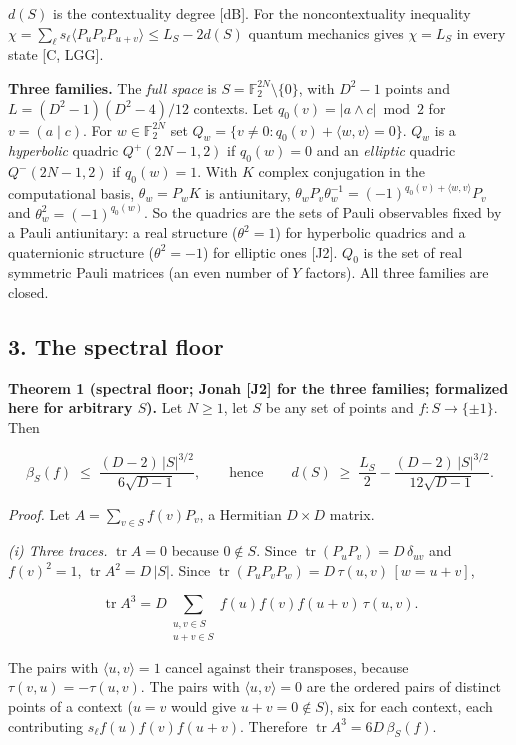 \documentclass[11pt,a4paper]{article}
\begin{document}
\(d(S)\) is the contextuality degree {[}dB{]}. For the noncontextuality inequality
\(\chi = \sum_\ell s_\ell \langle P_u P_v P_{u+v}\rangle \le L_S - 2 d(S)\) quantum mechanics gives
\(\chi = L_S\) in every state {[}C, LGG{]}.

\textbf{Three families.} The \emph{full space} is \(S = \mathbb{F}_2^{2N}\setminus\{0\}\), with \(D^2-1\) points
and \(L = (D^2-1)(D^2-4)/12\) contexts. Let \(q_0(v)=|a\wedge c|\bmod2\) for \(v=(a\mid c)\).
For \(w\in\mathbb{F}_2^{2N}\) set \(Q_w=\{v\ne0:q_0(v)+\langle w,v\rangle=0\}\).
\(Q_w\) is a \emph{hyperbolic} quadric \(Q^+(2N-1,2)\) if \(q_0(w)=0\) and an \emph{elliptic} quadric
\(Q^-(2N-1,2)\) if \(q_0(w)=1\). With \(K\) complex conjugation in the computational basis,
\(\theta_w=P_wK\) is antiunitary, \(\theta_wP_v\theta_w^{-1}=(-1)^{q_0(v)+\langle w,v\rangle}P_v\)
and \(\theta_w^2=(-1)^{q_0(w)}\). So the quadrics are the sets of Pauli observables fixed by a Pauli
antiunitary: a real structure (\(\theta^2 = 1\)) for hyperbolic quadrics and a quaternionic structure
(\(\theta^2 = -1\)) for elliptic ones {[}J2{]}. \(Q_0\) is the set of real symmetric Pauli matrices (an even
number of \(Y\) factors). All three families are closed.

\subsection{3. The spectral floor}\label{3-the-spectral-floor}

\textbf{Theorem 1 (spectral floor; Jonah {[}J2{]} for the three families; formalized here for arbitrary \(S\)).}
Let \(N \ge 1\), let \(S\) be any set of points and \(f : S \to \{\pm 1\}\). Then

\[\beta_S(f) \;\le\; \frac{(D-2)\,|S|^{3/2}}{6\sqrt{D-1}},
\qquad\text{hence}\qquad
d(S) \;\ge\; \frac{L_S}{2} - \frac{(D-2)\,|S|^{3/2}}{12\sqrt{D-1}} .\]

\emph{Proof.} Let \(A = \sum_{v \in S} f(v) P_v\), a Hermitian \(D \times D\) matrix.

\emph{(i) Three traces.} \(\operatorname{tr} A = 0\) because \(0 \notin S\). Since
\(\operatorname{tr}(P_u P_v) = D\,\delta_{uv}\) and \(f(v)^2 = 1\), \(\operatorname{tr} A^2 = D\,|S|\). Since
\(\operatorname{tr}(P_u P_v P_w) = D\,\tau(u,v)\,[w = u+v]\),

\[\operatorname{tr} A^3 = D \sum_{\substack{u, v \in S \\ u+v \in S}} f(u) f(v) f(u+v)\, \tau(u,v).\]

The pairs with \(\langle u,v\rangle = 1\) cancel against their transposes, because \(\tau(v,u) = -\tau(u,v)\).
The pairs with \(\langle u,v \rangle = 0\) are the ordered pairs of distinct points of a context
(\(u = v\) would give \(u + v = 0 \notin S\)), six for each context, each contributing \(s_\ell f(u)f(v)f(u+v)\).
Therefore \(\operatorname{tr} A^3 = 6 D\, \beta_S(f)\).
\end{document}
